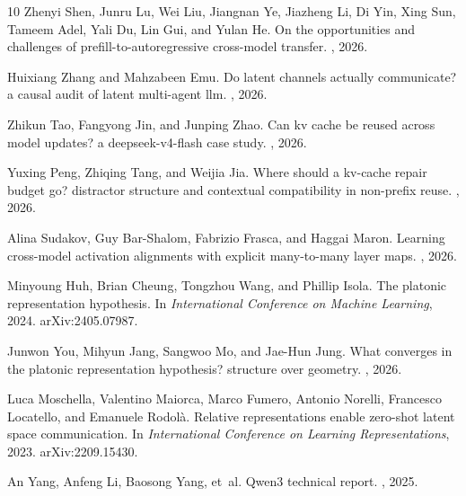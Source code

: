 \documentclass[11pt]{article}
\begin{document}
\begin{thebibliography}{10}
Zhenyi Shen, Junru Lu, Wei Liu, Jiangnan Ye, Jiazheng Li, Di Yin, Xing Sun,
  Tameem Adel, Yali Du, Lin Gui, and Yulan He.
\newblock On the opportunities and challenges of prefill-to-autoregressive
  cross-model transfer.
, 2026.

Huixiang Zhang and Mahzabeen Emu.
\newblock Do latent channels actually communicate? a causal audit of latent
  multi-agent llm.
, 2026.

Zhikun Tao, Fangyong Jin, and Junping Zhao.
\newblock Can kv cache be reused across model updates? a deepseek-v4-flash case
  study.
, 2026.

Yuxing Peng, Zhiqing Tang, and Weijia Jia.
\newblock Where should a kv-cache repair budget go? distractor structure and
  contextual compatibility in non-prefix reuse.
, 2026.

Alina Sudakov, Guy Bar-Shalom, Fabrizio Frasca, and Haggai Maron.
\newblock Learning cross-model activation alignments with explicit many-to-many
  layer maps.
, 2026.

Minyoung Huh, Brian Cheung, Tongzhou Wang, and Phillip Isola.
\newblock The platonic representation hypothesis.
\newblock In {\em International Conference on Machine Learning}, 2024.
\newblock arXiv:2405.07987.

Junwon You, Mihyun Jang, Sangwoo Mo, and Jae-Hun Jung.
\newblock What converges in the platonic representation hypothesis? structure over
  geometry.
, 2026.

Luca Moschella, Valentino Maiorca, Marco Fumero, Antonio Norelli, Francesco
  Locatello, and Emanuele Rodol{\`a}.
\newblock Relative representations enable zero-shot latent space communication.
\newblock In {\em International Conference on Learning Representations}, 2023.
\newblock arXiv:2209.15430.

An Yang, Anfeng Li, Baosong Yang, et~al.
\newblock Qwen3 technical report.
, 2025.
\end{thebibliography}

\appendix
\end{document}
